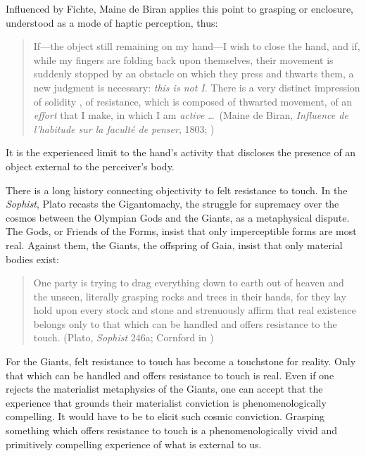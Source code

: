 Influenced by Fichte, Maine de Biran applies this point to grasping or enclosure, understood as a mode of haptic perception, thus:
\begin{quote}
	If---the object still remaining on my hand---I wish to close the hand, and if, while my fingers are folding back upon themselves, their movement is suddenly stopped by an obstacle on which they press and thwarts them, a new judgment is necessary: \emph{this is not I}. There is a very distinct impression of solidity , of resistance, which is composed of thwarted movement, of an \emph{effort} that I make, in which I am \emph{active} \ldots\ (Maine de Biran, \emph{Influence de l'habitude sur la facult\'{e} de penser}, 1803; \citealt[57]{Boehm:1929aa})
\end{quote}
It is the experienced limit to the hand's activity that discloses the presence of an object external to the perceiver's body.

There is a long history connecting objectivity to felt resistance to touch. In the \emph{Sophist}, Plato recasts the Gigantomachy, the struggle for supremacy over the cosmos between the Olympian Gods and the Giants, as a metaphysical dispute. The Gods, or Friends of the Forms, insist that only imperceptible forms are most real. Against them, the Giants, the offspring of Gaia, insist that only material bodies exist:
\begin{quote}
	One party is trying to drag everything down to earth out of heaven and the unseen, literally grasping rocks and trees in their hands, for they lay hold upon every stock and stone and strenuously affirm that real existence belongs only to that which can be handled and offers resistance to the touch. (Plato, \emph{Sophist} 246a; Cornford in \citealt[990]{Hamilton:1989fk})
\end{quote}
For the Giants, felt resistance to touch has become a touchstone for reality. Only that which can be handled and offers resistance to touch is real. Even if one rejects the materialist metaphysics of the Giants, one can accept that the experience that grounds their materialist conviction is phenomenologically compelling. It would have to be to elicit such cosmic conviction. Grasping something which offers resistance to touch is a phenomenologically vivid and primitively compelling experience of what is external to us. 

